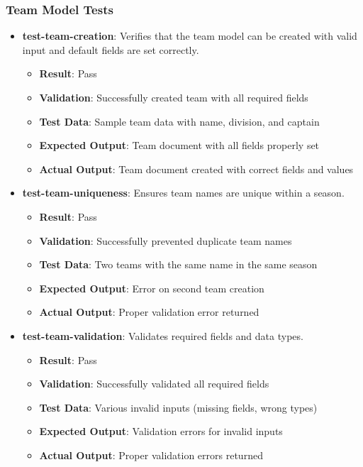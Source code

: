 \documentclass[12pt, titlepage]{article}
\begin{document}
\subsubsection{Team Model Tests}
\begin{itemize}
    \item \textbf{test-team-creation}: Verifies that the team model can be created with valid input and default fields are set correctly.
    \begin{itemize}
        \item \textbf{Result}: Pass
        \item \textbf{Validation}: Successfully created team with all required fields
        \item \textbf{Test Data}: Sample team data with name, division, and captain
        \item \textbf{Expected Output}: Team document with all fields properly set
        \item \textbf{Actual Output}: Team document created with correct fields and values
    \end{itemize}
    
    \item \textbf{test-team-uniqueness}: Ensures team names are unique within a season.
    \begin{itemize}
        \item \textbf{Result}: Pass
        \item \textbf{Validation}: Successfully prevented duplicate team names
        \item \textbf{Test Data}: Two teams with the same name in the same season
        \item \textbf{Expected Output}: Error on second team creation
        \item \textbf{Actual Output}: Proper validation error returned
    \end{itemize}
    
    \item \textbf{test-team-validation}: Validates required fields and data types.
    \begin{itemize}
        \item \textbf{Result}: Pass
        \item \textbf{Validation}: Successfully validated all required fields
        \item \textbf{Test Data}: Various invalid inputs (missing fields, wrong types)
        \item \textbf{Expected Output}: Validation errors for invalid inputs
        \item \textbf{Actual Output}: Proper validation errors returned
    \end{itemize}
\end{itemize}
\end{document}

